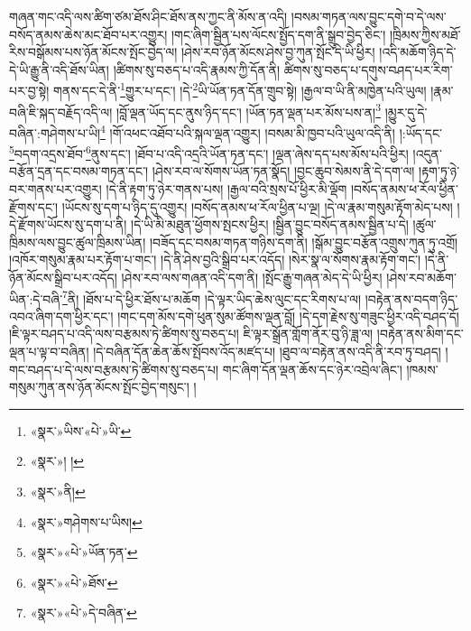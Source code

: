 གཞན་གང་འདི་ལས་ཚིག་ཙམ་ཐོས་ཤིང་ཐོས་ནས་ཀྱང་ནི་མོས་ན་འདི། །བསམ་གཏན་ལས་བྱུང་དགེ་བ་དེ་ལས་བསོད་ནམས་ཆེས་མང་ཐོབ་པར་འགྱུར། །གང་ཞིག་སྦྱིན་པས་ལོངས་སྤྱོད་དག་ནི་སྒྲུབ་བྱེད་ཅིང་། །ཁྲིམས་ཀྱིས་མཐོ་རིས་བསྒོམས་པས་ཉོན་མོངས་སྤོང་བྱེད་ལ། །ཤེས་རབ་ཉོན་མོངས་ཤེས་བྱ་ཀུན་སྤོང་དེ་ཡི་ཕྱིར། །འདི་མཆོག་ཉིད་དེ་དེ་ཡི་རྒྱུ་ནི་འདི་ཐོས་ཡིན། །ཚིགས་སུ་བཅད་པ་འདི་རྣམས་ཀྱི་དོན་ནི། ཚིགས་སུ་བཅད་པ་དགུས་བཤད་པར་རིག་པར་བྱ་སྟེ། གནས་དང་དེ་ནི་\footnote{«སྣར་»ཡིས་«པེ་»ཡི་}གྱུར་པ་དང་། །དེ་\footnote{«སྣར་»། །}ཡི་ཡོན་ཏན་དོན་གྲུབ་སྟེ། །རྒྱལ་བ་ཡི་ནི་མཁྱེན་པའི་ཡུལ། །རྣམ་བཞི་ཇི་སྐད་བརྗོད་འདི་ལ། །བློ་ལྡན་ཡོད་དང་ནུས་ཉིད་དང་། །ཡོན་ཏན་ལྡན་པར་མོས་པས་ན།\footnote{«སྣར་»ནི།} །མྱུར་དུ་དེ་བཞིན་:གཤེགས་པ་ཡི།\footnote{«སྣར་»གཤེགས་པ་ཡིས།} །གོ་འཕང་འཐོབ་པའི་སྐལ་ལྡན་འགྱུར། །བསམ་མི་ཁྱབ་པའི་ཡུལ་འདི་ནི། །:ཡོད་དང་\footnote{«སྣར་»«པེ་»ཡོན་ཏན་}བདག་འདྲས་ཐོབ་\footnote{«སྣར་»«པེ་»ཐོས་}ནུས་དང་། །ཐོབ་པ་འདི་འདྲའི་ཡོན་ཏན་དང་། །ལྡན་ཞེས་དད་པས་མོས་པའི་ཕྱིར། །འདུན་བརྩོན་དྲན་དང་བསམ་གཏན་དང་། །ཤེས་རབ་ལ་སོགས་ཡོན་ཏན་སྣོད། །བྱང་ཆུབ་སེམས་ནི་དེ་དག་ལ། །རྟག་ཏུ་ཉེ་བར་གནས་པར་འགྱུར། །དེ་ནི་རྟག་ཏུ་ཉེར་གནས་པས། །རྒྱལ་བའི་སྲས་པོ་ཕྱིར་མི་ལྡོག །བསོད་ནམས་ཕ་རོལ་ཕྱིན་རྫོགས་དང་། །ཡོངས་སུ་དག་པ་ཉིད་དུ་འགྱུར། །བསོད་ནམས་ཕ་རོལ་ཕྱིན་པ་ལྔ། །དེ་ལ་རྣམ་གསུམ་རྟོག་མེད་པས། །དེ་རྫོགས་ཡོངས་སུ་དག་པ་ནི། །དེ་ཡི་མི་མཐུན་ཕྱོགས་སྤངས་ཕྱིར། །སྦྱིན་བྱུང་བསོད་ནམས་སྦྱིན་པ་དེ། །ཚུལ་ཁྲིམས་ལས་བྱུང་ཚུལ་ཁྲིམས་ཡིན། །བཟོད་དང་བསམ་གཏན་གཉིས་དག་ནི། །སྒོམ་བྱུང་བརྩོན་འགྲུས་ཀུན་ཏུ་འགྲོ། །འཁོར་གསུམ་རྣམ་པར་རྟོག་པ་གང་། །དེ་ནི་ཤེས་བྱའི་སྒྲིབ་པར་འདོད། །སེར་སྣ་ལ་སོགས་རྣམ་རྟོག་གང་། །དེ་ནི་ཉོན་མོངས་སྒྲིབ་པར་འདོད། །ཤེས་རབ་ལས་གཞན་འདི་དག་ནི། །སྤོང་རྒྱུ་གཞན་མེད་དེ་ཡི་ཕྱིར། །ཤེས་རབ་མཆོག་ཡིན་:དེ་བཞི་\footnote{«སྣར་»«པེ་»དེ་བཞིན་}ནི། །ཐོས་པ་དེ་ཕྱིར་ཐོས་པ་མཆོག །དེ་ལྟར་ཡིད་ཆེས་ལུང་དང་རིགས་པ་ལ། །བརྟེན་ནས་བདག་ཉིད་འབའ་ཞིག་དག་ཕྱིར་དང་། །གང་དག་མོས་དགེ་ཕུན་སུམ་ཚོགས་ལྡན་བློ། །དེ་དག་རྗེས་སུ་གཟུང་ཕྱིར་འདི་བཤད་དོ། །ཇི་ལྟར་བཤད་པ་འདི་ལས་བརྩམས་ཏེ་ཚིགས་སུ་བཅད་པ། ཇི་ལྟར་སྒྲོན་གློག་ནོར་བུ་ཉི་ཟླ་ལ། །བརྟེན་ནས་མིག་དང་ལྡན་པ་ལྟ་བ་བཞིན། །དེ་བཞིན་དོན་ཆེན་ཆོས་སྤོབས་འོད་མཛད་པ། །ཐུབ་ལ་བརྟེན་ནས་འདི་ནི་རབ་ཏུ་བཤད། །གང་བཤད་པ་དེ་ལས་བརྩམས་ཏེ་ཚིགས་སུ་བཅད་པ། གང་ཞིག་དོན་ལྡན་ཆོས་དང་ཉེར་འབྲེལ་ཞིང་། །ཁམས་གསུམ་ཀུན་ནས་ཉོན་མོངས་སྤོང་བྱེད་གསུང་། །
